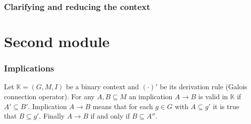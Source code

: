 \documentclass[a4paper]{article}
\newcommand{\brac}[1]{{\left ( #1 \right )}}
\newcommand{\Ctx}{\mathbb{K}}
\begin{document}



\section{Clarifying and reducing the context} %
\label{sec:clarifying_and_reducing_the_context}










\part{Second module} %
\label{prt:second_module}

\section{Implications} %
\label{sec:implications}

Let $\Ctx = \brac{G,M,I}$ be a binary context and ${(\cdot)}'$ be its derivation rule (Galois connection operator). For any $A,B\subseteq M$ an implication $A\to B$ is valid in $\Ctx$ if $A'\subseteq B'$. Implication $A\to B$ means that for each $g\in G$ with $A\subseteq g'$ it is true that $B\subseteq g'$. Finally $A\to B$ if and only if $B\subseteq A''$.
\end{document}
